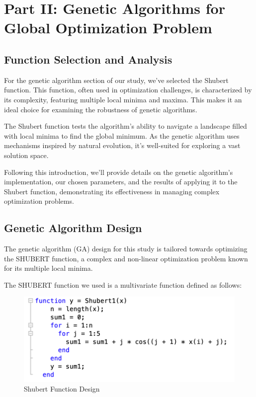 \documentclass[conference]{inc/IEEEtran}
\begin{document}
\section{Part II: Genetic Algorithms for Global Optimization Problem}

\subsection{Function Selection and Analysis}

For the genetic algorithm section of our study, we've selected the Shubert function. This function, often used in optimization challenges, is characterized
by its complexity, featuring multiple local minima and maxima. This makes it an ideal choice for examining the robustness of genetic algorithms.

The Shubert function tests the algorithm's ability to navigate a landscape filled with local minima to find the global minimum. As the genetic algorithm
uses mechanisms inspired by natural evolution, it's well-suited for exploring a vast solution space.

Following this introduction, we'll provide details on the genetic algorithm's implementation, our chosen parameters, and the results of applying it to the
Shubert function, demonstrating its effectiveness in managing complex optimization problems.

\subsection{Genetic Algorithm Design}

The genetic algorithm (GA) design for this study is tailored towards optimizing the SHUBERT function, a complex and non-linear optimization problem known for its multiple local minima.

The SHUBERT function we used is a multivariate function defined as follows:

\begin{figure}
    \includegraphics[width=\linewidth]{figures/shubertdes.png}
    \caption{Shubert Function Design}
    \label{fig:boat1}
  \end{figure}
\end{document}
